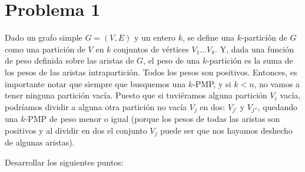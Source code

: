 \documentclass[11pt, a4paper, twoside]{article}
\begin{document}
\clearpage{\pagestyle{empty}\cleardoublepage}


\newpage

\section{Problema 1}
Dado un grafo simple $G = (V,E)$ y un entero $k$, se define una $k$-partición de $G$ como
una partición de $V$ en $k$ conjuntos de vértices $V_{1} \dots V_{k}$. Y, dada una función
de peso definida sobre las aristas de $G$, el peso de una $k$-partición es la suma de los pesos
de las aristas intrapartición. Todos los pesos son positivos. Entonces, es importante notar que
siempre que busquemos una $k$-PMP, y si $k < n$, no vamos a tener ninguna partición vacía. Puesto 
que si tuviéramos alguna partición $V_{i}$ vacía, podríamos dividir a alguna otra partición no
vacía $V_{j}$ en dos: $V_{j'}$ y $V_{j''}$, quedando una $k$-PMP de peso menor o igual (porque los pesos de
todas las aristas son positivos y al dividir en dos el conjunto $V_{j}$ puede ser que nos hayamos
deshecho de algunas aristas).

Desarrollar los siguientes puntos:
		
\end{document}
